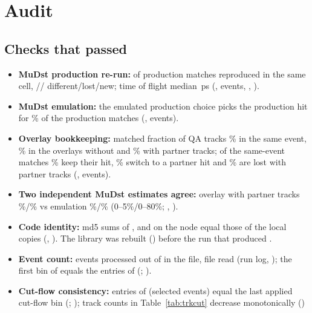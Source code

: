 \section{Audit}
\label{sec:audit}

\subsection{Checks that passed}
\begin{itemize}
\item \textbf{MuDst production re-run:} \clNSame{} of \clNSame{} production matches reproduced in the same cell,
  \clNOther{}/\clNOnlyProd{}/\clNOnlyRerun{} different/lost/new; time of flight median \clDtofMed\,ps
  (, \clEvents{} events, , ).
\item \textbf{MuDst emulation:} the emulated production choice picks the production hit for \muChoiceSame\% of the production
  matches (, \muEvMtwo{} events).
\item \textbf{Overlay bookkeeping:} matched fraction of QA tracks \ovSEMatch\% in the same event, \ovAnyMatch\% in the
  overlays without and \ovtAnyMatch\% with partner tracks; of the same-event matches \ovtSEkeep\% keep their hit,
  \ovtSEswap\% switch to a partner hit and \ovtSElose\% are lost with partner tracks (, \ovtEvMtwo{} events).
\item \textbf{Two independent MuDst estimates agree:} overlay with partner tracks \ovtFrCi\%/\ovtFrAll\% vs emulation
  \muFrProdCi\%/\muFrProdAll\% (0--5\%/0--80\%; , ).
\item \textbf{Code identity:} md5 sums of ,  and
   on the node equal those of the local copies (, ).
  The library was rebuilt () before the run that produced .
\item \textbf{Event count:} \nProcEvents{} events processed out of \nChainEvents{} in the file, \nFilesRead{}
  file read (run log, ); the first bin of  equals the entries of
   (\nEvtAll; \checkEvtAll).
\item \textbf{Cut-flow consistency:} entries of  (selected events) equal the last
  applied cut-flow bin (\nEvtSel; \checkEvtSel); track counts in Table~\ref{tab:trkcut} decrease monotonically (\checkTrkFlow)

\end{itemize}
